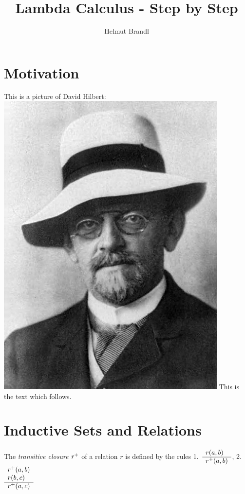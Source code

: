 \documentclass{article}
\begin{document}


\title{Lambda Calculus - Step by Step}
\author{Helmut Brandl}
\date{}


\maketitle

\tableofcontents

\section{Motivation}

This is a picture of David
Hilbert:\includegraphics[scale=0.2,angle=90]{../img/hilbert.jpg} This is the text
which follows.


\section{Inductive Sets and Relations}


\begin{definition} The \emph{transitive closure} $r^+$ of a relation $r$ is
  defined by the rules
1.~$\begin{array}{l} r(a,b) \\ \hline r^+(a,b)\end{array}$,
2.~$\begin{array}{l} r^+(a,b) \\ r(b,c) \\ \hline r^+(a,c)\end{array}$
\end{definition}
\end{document}
